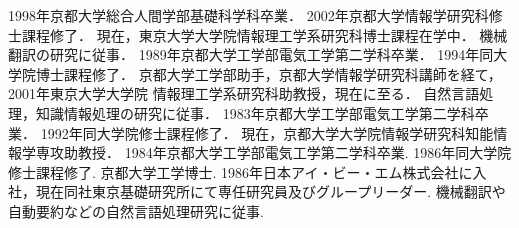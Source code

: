 




\begin{biography}

{
	1998年京都大学総合人間学部基礎科学科卒業．
	2002年京都大学情報学研究科修士課程修了．
	現在，東京大学大学院情報理工学系研究科博士課程在学中．
	機械翻訳の研究に従事．
}
{
	1989年京都大学工学部電気工学第二学科卒業．
	1994年同大学院博士課程修了．
	京都大学工学部助手，京都大学情報学研究科講師を経て，2001年東京大学大学院
	情報理工学系研究科助教授，現在に至る．
	自然言語処理，知識情報処理の研究に従事．
}
{
	1983年京都大学工学部電気工学第二学科卒業．
	1992年同大学院修士課程修了．
	現在，京都大学大学院情報学研究科知能情報学専攻助教授．
}
{
	1984年京都大学工学部電気工学第二学科卒業. 
	1986年同大学院修士課程修了. 京都大学工学博士. 
	1986年日本アイ・ビー・エム株式会社に入社，現在同社東京基礎研究所にて専任研究員及びグループリーダー.
	 機械翻訳や自動要約などの自然言語処理研究に従事.
}


\end{biography}

